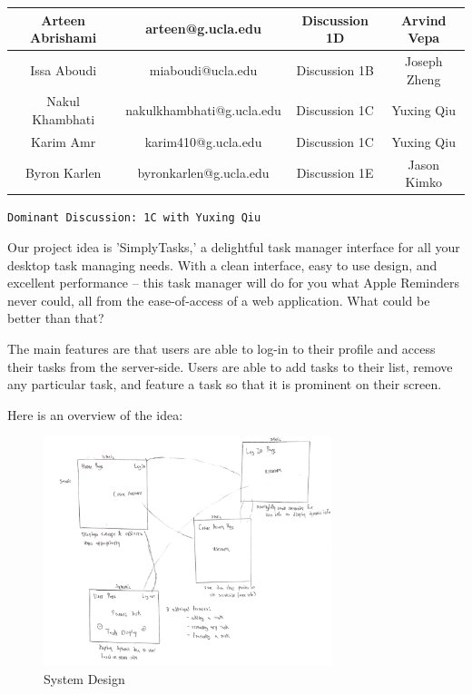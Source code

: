 \documentclass[10pt, letterpaper]{article}
\let\tab\quad
\begin{document}
\begin{table}
	\begin{tabular}{| c c c c |}
		
		\hline
		Arteen Abrishami & arteen@g.ucla.edu & Discussion 1D & Arvind Vepa \\
		\hline
		Issa Aboudi & miaboudi@ucla.edu & Discussion 1B & Joseph Zheng \\
		\hline
		Nakul Khambhati & nakulkhambhati@g.ucla.edu & Discussion 1C & Yuxing Qiu \\
		\hline
		Karim Amr & karim410@g.ucla.edu & Discussion 1C & Yuxing Qiu \\
		\hline
		Byron Karlen & byronkarlen@g.ucla.edu & Discussion 1E & Jason Kimko\\
		\hline
		
	\end{tabular}
\end{table}

\texttt{Dominant Discussion: 1C with Yuxing Qiu}

\tab Our project idea is 'SimplyTasks,' a delightful task manager interface for all your desktop task managing needs. With a clean interface, easy to use design, and excellent performance -- this task manager will do for you what Apple Reminders never could, all from the ease-of-access of a web application. What could be better than that?

\tab The main features are that users are able to log-in to their profile and access their tasks from the server-side. Users are able to add tasks to their list, remove any particular task, and feature a task so that it is prominent on their screen.

\tab Here is an overview of the idea: 

\begin{figure}[h!]
	\begin{center}
		\includegraphics[width=0.75\textwidth]{illustration.png}
	\caption{System Design}
	\label{fig:design}
	\end{center}
\end{figure}
\end{document}

